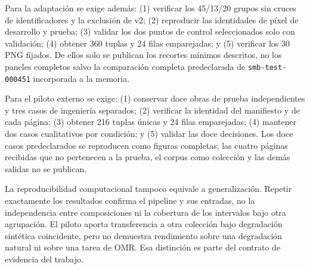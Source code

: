 Para la adaptación se exige además: (1) verificar los 45/13/20 grupos sin cruces de identificadores y la exclusión de
v2; (2) reproducir las identidades de píxel de desarrollo y prueba; (3) validar los dos puntos de
control seleccionados solo con validación; (4) obtener 360 tuplas y 24 filas emparejadas; y (5)
verificar los 30 PNG fijados. De ellos solo se publican los recortes mínimos descritos, no los
paneles completos salvo la comparación completa predeclarada de
\texttt{smb-test-000451} incorporada a la memoria.

Para el piloto externo se exige: (1) conservar doce obras de prueba independientes y tres casos de
ingeniería separados; (2) verificar la identidad del manifiesto y de cada página; (3) obtener 216
tuplas únicas y 24 filas emparejadas; (4) mantener dos casos cualitativos por condición; y (5)
validar las doce decisiones. Los doce casos predeclarados se reproducen como figuras completas; las
cuatro páginas recibidas que no pertenecen a la prueba, el corpus como colección y las demás salidas
no se publican.

La reproducibilidad computacional tampoco equivale a generalización. Repetir exactamente los
resultados confirma el pipeline y sus entradas, no la independencia entre composiciones ni la
cobertura de los intervalos bajo otra agrupación. El piloto aporta transferencia a otra colección
bajo degradación sintética coincidente, pero no demuestra rendimiento sobre una degradación natural
ni sobre una tarea de OMR. Esa distinción es parte del contrato de evidencia del trabajo.
